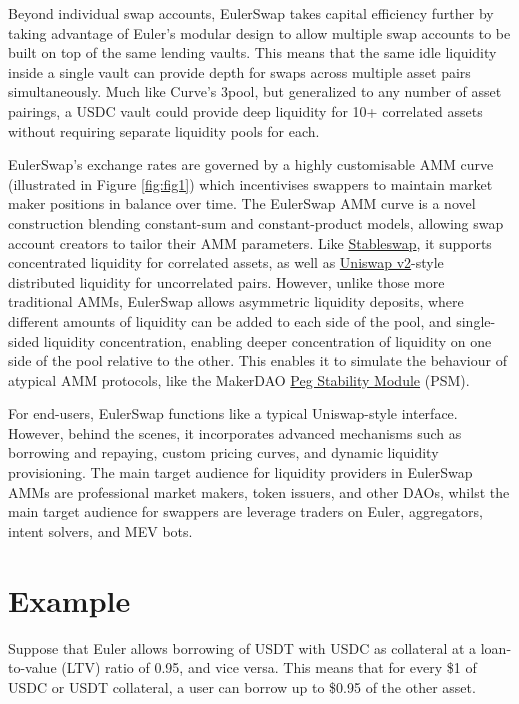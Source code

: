 \documentclass{article}
\begin{document}
Beyond individual swap accounts, EulerSwap takes capital efficiency further by taking advantage of Euler's modular design to allow multiple swap accounts to be built on top of the same lending vaults. This means that the same idle liquidity inside a single vault can provide depth for swaps across multiple asset pairs simultaneously. Much like Curve’s 3pool, but generalized to any number of asset pairings, a USDC vault could provide deep liquidity for 10+ correlated assets without requiring separate liquidity pools for each.

EulerSwap’s exchange rates are governed by a highly customisable AMM curve (illustrated in Figure \ref{fig:fig1}) which incentivises swappers to maintain market maker positions in balance over time. The EulerSwap AMM curve is a novel construction blending constant-sum and constant-product models, allowing swap account creators to tailor their AMM parameters. Like \href{https://berkeley-defi.github.io/assets/material/StableSwap.pdf}{Stableswap}, it supports concentrated liquidity for correlated assets, as well as \href{https://app.uniswap.org/whitepaper.pdf}{Uniswap v2}-style distributed liquidity for uncorrelated pairs. However, unlike those more traditional AMMs, EulerSwap allows asymmetric liquidity deposits, where different amounts of liquidity can be added to each side of the pool, and single-sided liquidity concentration, enabling deeper concentration of liquidity on one side of the pool relative to the other. This enables it to simulate the behaviour of atypical AMM protocols, like the MakerDAO \href{https://mips.makerdao.com/mips/details/MIP29}{Peg Stability Module} (PSM).

For end-users, EulerSwap functions like a typical Uniswap-style interface. However, behind the scenes, it incorporates advanced mechanisms such as borrowing and repaying, custom pricing curves, and dynamic liquidity provisioning. The main target audience for liquidity providers in EulerSwap AMMs are professional market makers, token issuers, and other DAOs, whilst the main target audience for swappers are leverage traders on Euler, aggregators, intent solvers, and MEV bots.  

\section{Example}

Suppose that Euler allows borrowing of USDT with USDC as collateral at a loan-to-value (LTV) ratio of 0.95, and vice versa. This means that for every \$1 of USDC or USDT collateral, a user can borrow up to \$0.95 of the other asset. 
\end{document}
